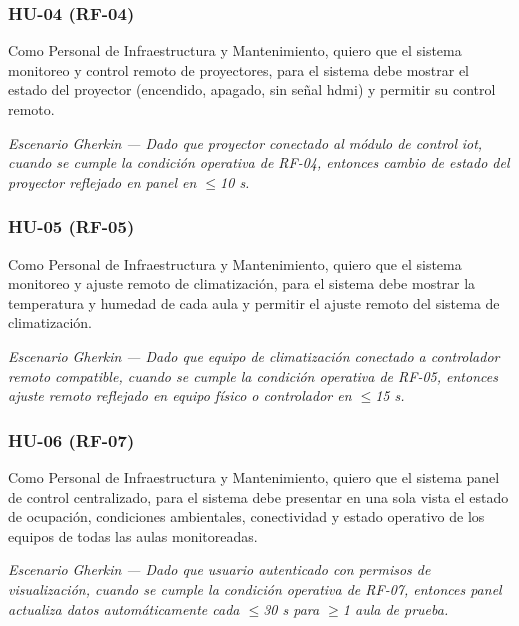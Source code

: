\subsubsection*{HU-04 (RF-04)}


Como Personal de Infraestructura y Mantenimiento, quiero que el sistema monitoreo y control remoto de proyectores, para el sistema debe mostrar el estado del proyector (encendido, apagado, sin señal hdmi) y permitir su control remoto.


\textit{Escenario }\textit{Gherkin}\textit{ --- Dado que proyector conectado al módulo de control }\textit{iot}\textit{, cuando se cumple la condición operativa de RF-04, entonces cambio de estado del proyector reflejado en panel en $\leq$10 s.}


\subsubsection*{HU-05 (RF-05)}


Como Personal de Infraestructura y Mantenimiento, quiero que el sistema monitoreo y ajuste remoto de climatización, para el sistema debe mostrar la temperatura y humedad de cada aula y permitir el ajuste remoto del sistema de climatización.


\textit{Escenario }\textit{Gherkin}\textit{ --- Dado que equipo de climatización conectado a controlador remoto compatible, cuando se cumple la condición operativa de RF-05, entonces ajuste remoto reflejado en equipo físico o controlador en $\leq$15 s.}


\subsubsection*{HU-06 (RF-07)}


Como Personal de Infraestructura y Mantenimiento, quiero que el sistema panel de control centralizado, para el sistema debe presentar en una sola vista el estado de ocupación, condiciones ambientales, conectividad y estado operativo de los equipos de todas las aulas monitoreadas.


\textit{Escenario }\textit{Gherkin}\textit{ --- Dado que usuario autenticado con permisos de visualización, cuando se cumple la condición operativa de RF-07, entonces panel actualiza datos automáticamente cada $\leq$30 s para $\geq$1 aula de prueba.}


